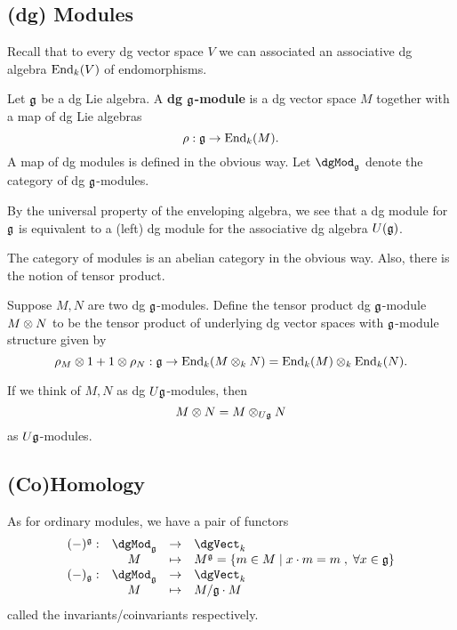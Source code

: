 \documentclass[11pt]{amsart}
\begin{document}
\subsection{(dg) Modules}

Recall that to every dg vector space $V$ we can associated an associative dg algebra ${\rm End}_k(V)$ of endomorphisms. 

\begin{dfn}
Let $\mathfrak g$ be a dg Lie algebra.
A {\bf dg $\mathfrak g$-module} is a dg vector space $M$ together with a map of dg Lie algebras
\[
\rho : \mathfrak g \to {\rm End}_k(M) .
\]
A map of dg modules is defined in the obvious way. 
Let $\dgMod_{\fg}$ denote the category of dg $\mathfrak g$-modules. 
\end{dfn}

\begin{rmk}
By the universal property of the enveloping algebra, we see that a dg module for $\mathfrak g$ is equivalent to a (left) dg module for the associative dg algebra $U(\mathfrak g)$. 
\end{rmk}

The category of modules is an abelian category in the obvious way. 
Also, there is the notion of tensor product. 

\begin{dfn}
Suppose $M,N$ are two dg $\mathfrak g$-modules.
Define the tensor product dg $\mathfrak g$-module $M \otimes N$ to be the tensor product of underlying dg vector spaces with $\mathfrak g$-module structure given by
\[
\rho_{M} \otimes 1 + 1 \otimes \rho_N : \mathfrak g \to {\rm End}_k(M \otimes_k N) = {\rm End}_k(M) \otimes_k {\rm End}_k(N) .
\]
\end{dfn}

\begin{rmk}
If we think of $M,N$ as dg $U\mathfrak g$-modules, then 
\[
M \otimes N = M \otimes_{U\mathfrak g} N
\]
as $U \mathfrak g$-modules. 
\end{rmk}

\subsection{(Co)Homology}

As for ordinary modules, we have a pair of functors
\[
\begin{array}{cccl}
(-)^\fg : & \dgMod_\fg & \to & \dgVect_k  \\
& M & \mapsto & M^\fg = \{m \in M \; | \; x \cdot m = m \; , \; \forall x \in \fg\} \\
(-)_{\fg} : & \dgMod_{\fg} & \to & \dgVect_k \\
& M & \mapsto & M / \fg \cdot M 
\end{array}
\]
called the invariants/coinvariants respectively. 
\end{document}
